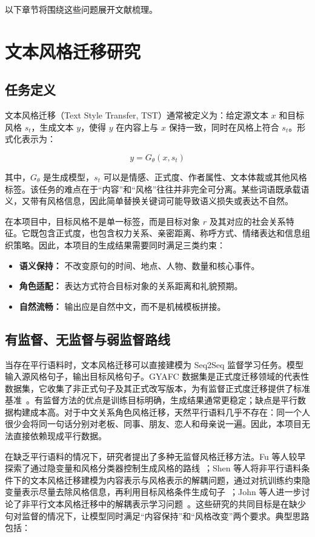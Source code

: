 \documentclass[12pt,a4paper]{ctexart}
\begin{document}
以下章节将围绕这些问题展开文献梳理。

\section{文本风格迁移研究}

\subsection{任务定义}

文本风格迁移（Text Style Transfer, TST）通常被定义为：给定源文本 $x$ 和目标风格 $s_t$，生成文本 $y$，使得 $y$ 在内容上与 $x$ 保持一致，同时在风格上符合 $s_t$。形式化表示为：

\[
y = G_\theta(x, s_t)
\]

其中，$G_\theta$ 是生成模型，$s_t$ 可以是情感、正式度、作者属性、文本体裁或其他风格标签。该任务的难点在于“内容”和“风格”往往并非完全可分离。某些词语既承载语义，又带有风格信息，因此简单替换关键词可能导致语义损失或表达不自然。

在本项目中，目标风格不是单一标签，而是目标对象 $r$ 及其对应的社会关系特征。它既包含正式度，也包含权力关系、亲密距离、称呼方式、情绪表达和信息组织策略。因此，本项目的生成结果需要同时满足三类约束：

\begin{itemize}[leftmargin=2em]
  \item \textbf{语义保持：} 不改变原句的时间、地点、人物、数量和核心事件。
  \item \textbf{角色适配：} 表达方式符合目标对象的关系距离和礼貌预期。
  \item \textbf{自然流畅：} 输出应是自然中文，而不是机械模板拼接。
\end{itemize}

\subsection{有监督、无监督与弱监督路线}

当存在平行语料时，文本风格迁移可以直接建模为 Seq2Seq 监督学习任务。模型输入源风格句子，输出目标风格句子。GYAFC 数据集是正式度迁移领域的代表性数据集，它收集了非正式句子及其正式改写版本，为有监督正式度迁移提供了标准基准~\cite{rao2018gyafc}。有监督方法的优点是训练目标明确，生成结果通常更稳定；缺点是平行数据构建成本高。对于中文关系角色风格迁移，天然平行语料几乎不存在：同一个人很少会将同一句话分别对老板、同事、朋友、恋人和母亲说一遍。因此，本项目无法直接依赖现成平行数据。

在缺乏平行语料的情况下，研究者提出了多种无监督风格迁移方法。Fu 等人较早探索了通过隐变量和风格分类器控制生成风格的路线~\cite{fu2018style}；Shen 等人将非平行语料条件下的文本风格迁移建模为内容表示与风格表示的解耦问题，通过对抗训练约束隐变量表示尽量去除风格信息，再利用目标风格条件生成句子~\cite{shen2017styletransfer}；John 等人进一步讨论了非平行文本风格迁移中的解耦表示学习问题~\cite{john2019}。这些研究的共同目标是在缺少句对监督的情况下，让模型同时满足“内容保持”和“风格改变”两个要求。典型思路包括：
\end{document}
